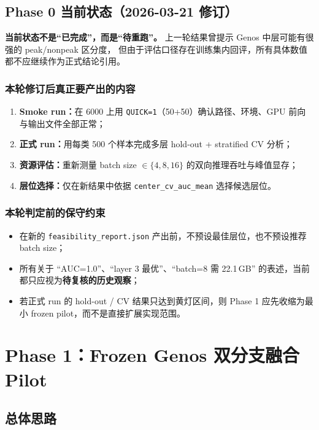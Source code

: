 \documentclass[11pt,a4paper]{ctexart}
\begin{document}
\subsection{Phase 0 当前状态（2026-03-21 修订）}

\textbf{当前状态不是“已完成”，而是“待重跑”。}
上一轮结果曾提示 Genos 中层可能有很强的 peak/nonpeak 区分度，
但由于评估口径存在训练集内回评，所有具体数值都不应继续作为正式结论引用。

\subsubsection{本轮修订后真正要产出的内容}

\begin{enumerate}[leftmargin=2em]
  \item \textbf{Smoke run：}在 6000 上用 \texttt{QUICK=1}（50+50）确认路径、环境、GPU 前向与输出文件全部正常；
  \item \textbf{正式 run：}用每类 500 个样本完成多层 hold-out + stratified CV 分析；
  \item \textbf{资源评估：}重新测量 batch size $\in \{4, 8, 16\}$ 的双向推理吞吐与峰值显存；
  \item \textbf{层位选择：}仅在新结果中依据 \texttt{center\_cv\_auc\_mean} 选择候选层位。
\end{enumerate}

\subsubsection{本轮判定前的保守约束}

\begin{itemize}[leftmargin=2em]
  \item 在新的 \texttt{feasibility\_report.json} 产出前，不预设最佳层位，也不预设推荐 batch size；
  \item 所有关于 “AUC=1.0”、“layer 3 最优”、“batch=8 需 22.1\,GB” 的表述，当前都只应视为\textbf{待复核的历史观察}；
  \item 若正式 run 的 hold-out / CV 结果只达到黄灯区间，则 Phase 1 应先收缩为最小 frozen pilot，而不是直接扩展实现范围。
\end{itemize}

\section{Phase 1：Frozen Genos 双分支融合 Pilot}

\subsection{总体思路}
\end{document}
